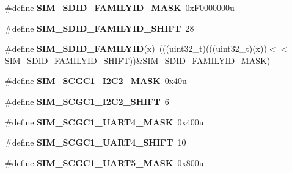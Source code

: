\begin{DoxyCompactItemize}
\item 
\#define {\bfseries S\+I\+M\+\_\+\+S\+D\+I\+D\+\_\+\+F\+A\+M\+I\+L\+Y\+I\+D\+\_\+\+M\+A\+SK}~0x\+F0000000u\hypertarget{group__SIM__Register__Masks_gaab3bc97c4c3b6f7c4780a7fa68bd4e9b}{}\label{group__SIM__Register__Masks_gaab3bc97c4c3b6f7c4780a7fa68bd4e9b}

\item 
\#define {\bfseries S\+I\+M\+\_\+\+S\+D\+I\+D\+\_\+\+F\+A\+M\+I\+L\+Y\+I\+D\+\_\+\+S\+H\+I\+FT}~28\hypertarget{group__SIM__Register__Masks_gaf7e40106aa5caded7c37374b009b5a41}{}\label{group__SIM__Register__Masks_gaf7e40106aa5caded7c37374b009b5a41}

\item 
\#define {\bfseries S\+I\+M\+\_\+\+S\+D\+I\+D\+\_\+\+F\+A\+M\+I\+L\+Y\+ID}(x)~(((uint32\+\_\+t)(((uint32\+\_\+t)(x))$<$$<$S\+I\+M\+\_\+\+S\+D\+I\+D\+\_\+\+F\+A\+M\+I\+L\+Y\+I\+D\+\_\+\+S\+H\+I\+FT))\&S\+I\+M\+\_\+\+S\+D\+I\+D\+\_\+\+F\+A\+M\+I\+L\+Y\+I\+D\+\_\+\+M\+A\+SK)\hypertarget{group__SIM__Register__Masks_ga5c2906e2cb4988454c659f8129d608f4}{}\label{group__SIM__Register__Masks_ga5c2906e2cb4988454c659f8129d608f4}

\item 
\#define {\bfseries S\+I\+M\+\_\+\+S\+C\+G\+C1\+\_\+\+I2\+C2\+\_\+\+M\+A\+SK}~0x40u\hypertarget{group__SIM__Register__Masks_ga69a2d83139dbf6c8556ea12093541809}{}\label{group__SIM__Register__Masks_ga69a2d83139dbf6c8556ea12093541809}

\item 
\#define {\bfseries S\+I\+M\+\_\+\+S\+C\+G\+C1\+\_\+\+I2\+C2\+\_\+\+S\+H\+I\+FT}~6\hypertarget{group__SIM__Register__Masks_ga38f9e5095d2d1d847970da85e390e7f9}{}\label{group__SIM__Register__Masks_ga38f9e5095d2d1d847970da85e390e7f9}

\item 
\#define {\bfseries S\+I\+M\+\_\+\+S\+C\+G\+C1\+\_\+\+U\+A\+R\+T4\+\_\+\+M\+A\+SK}~0x400u\hypertarget{group__SIM__Register__Masks_ga8f954b824205f507499799ba8262b366}{}\label{group__SIM__Register__Masks_ga8f954b824205f507499799ba8262b366}

\item 
\#define {\bfseries S\+I\+M\+\_\+\+S\+C\+G\+C1\+\_\+\+U\+A\+R\+T4\+\_\+\+S\+H\+I\+FT}~10\hypertarget{group__SIM__Register__Masks_ga0808f41650f2b3824b779bf4f2273f08}{}\label{group__SIM__Register__Masks_ga0808f41650f2b3824b779bf4f2273f08}

\item 
\#define {\bfseries S\+I\+M\+\_\+\+S\+C\+G\+C1\+\_\+\+U\+A\+R\+T5\+\_\+\+M\+A\+SK}~0x800u\hypertarget{group__SIM__Register__Masks_ga6d5168e1b4f532ad0d6e3836dd5560f3}{}\label{group__SIM__Register__Masks_ga6d5168e1b4f532ad0d6e3836dd5560f3}


\end{DoxyCompactItemize}
